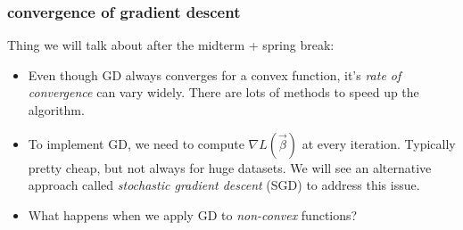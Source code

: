 \documentclass[handout,compress]{beamer}
\begin{document}
\begin{frame}
		\frametitle{convergence of gradient descent}
		Thing we will talk about after the midterm + spring break:
		\begin{itemize}
			\item Even though GD always converges for a convex function, it's \emph{rate of convergence} can vary widely. There are lots of methods to speed up the algorithm. 
			\item To implement GD, we need to compute $\nabla L(\vec{\beta})$ at every iteration. Typically pretty cheap, but not always for huge datasets. We will see an alternative approach called \emph{stochastic gradient descent} (SGD) to address this issue.
			\item What happens when we apply GD to \emph{non-convex} functions?  
		\end{itemize}
\end{frame}
\end{document}
